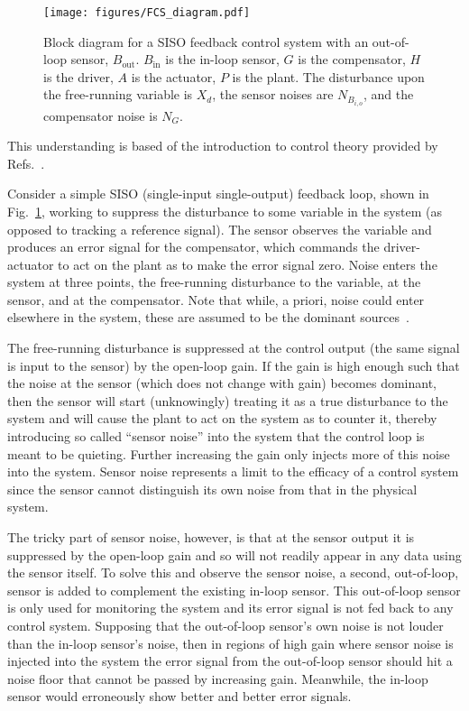 \documentclass[aps,pra,superscriptaddress,reprint,nofootinbib]{revtex4-1}
\begin{document}
\begin{figure}
	\texttt{[image: figures/FCS\_diagram.pdf]}
	\caption{Block diagram for a SISO feedback control system with an out-of-loop sensor, $B_{\mathrm{out}}$. $B_{\mathrm{in}}$ is the in-loop sensor, $G$ is the compensator, $H$ is the driver, $A$ is the actuator, $P$ is the plant. The disturbance upon the free-running variable is $X_d$, the sensor noises are $N_{B_{i,o}}$, and the compensator noise is $N_G$.}
	\label{fig:block_FCS_diagram}
\end{figure}


This understanding is based of the introduction to control theory provided by Refs.~\cite{Ward:2010,Bechhoefer:2005,FCS:2000}.


Consider a simple SISO (single-input single-output) feedback loop, shown in Fig.~\ref{fig:block_FCS_diagram}, working to suppress the disturbance to some variable in the system (as opposed to tracking a reference signal). The sensor observes the variable and produces an error signal for the compensator, which commands the driver-actuator to act on the plant as to make the error signal zero. Noise enters the system at three points, the free-running disturbance to the variable, at the sensor, and at the compensator. Note that while, a priori, noise could enter elsewhere in the system, these are assumed to be the dominant sources~\cite{FCS:2000}. 


The free-running disturbance is suppressed at the control output (the same signal is input to the sensor) by the open-loop gain. If the gain is high enough such that the noise at the sensor (which does not change with gain) becomes dominant, then the sensor will start (unknowingly) treating it as a true disturbance to the system and will cause the plant to act on the system as to counter it, thereby introducing so called ``sensor noise'' into the system that the control loop is meant to be quieting. Further increasing the gain only injects more of this noise into the system. Sensor noise represents a limit to the efficacy of a control system since the sensor cannot distinguish its own noise from that in the physical system.


The tricky part of sensor noise, however, is that at the sensor output it is suppressed by the open-loop gain and so will not readily appear in any data using the sensor itself. To solve this and observe the sensor noise, a second, out-of-loop, sensor is added to complement the existing in-loop sensor. This out-of-loop sensor is only used for monitoring the system and its error signal is not fed back to any control system. Supposing that the out-of-loop sensor’s own noise is not louder than the in-loop sensor’s noise, then in regions of high gain where sensor noise is injected into the system the error signal from the out-of-loop sensor should hit a noise floor that cannot be passed by increasing gain. Meanwhile, the in-loop sensor would erroneously show better and better error signals.
\end{document}
